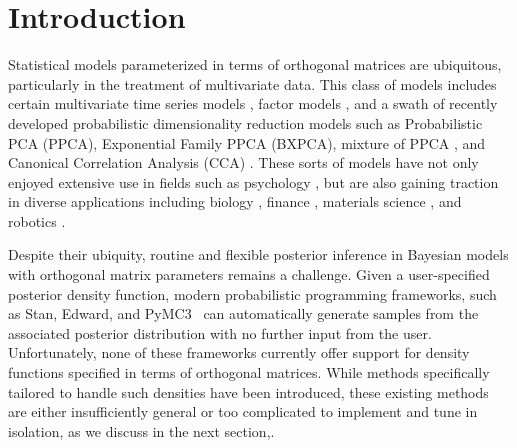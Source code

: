 \documentclass[ba]{imsart}
\numberwithin{equation}{section}
\theoremstyle{plain}
\begin{document}
\section{Introduction}
Statistical models parameterized in terms of orthogonal matrices are ubiquitous, particularly in the treatment of multivariate data. This class of models includes certain multivariate time series models \citep{brockwell2002introduction}, factor models \citep{johnson2004multivariate}, and a swath of recently developed probabilistic dimensionality reduction models such as Probabilistic PCA (PPCA),  Exponential Family PPCA (BXPCA), mixture of PPCA \citep{ghahramani1996algorithm}, and Canonical Correlation Analysis (CCA) \citep[Chapt.~12.5]{murphy2012machine}. These sorts of models have not only enjoyed extensive use in fields such as psychology \citep{ford1986application}, but are also gaining traction in diverse applications including biology \citep{hamelryck2006sampling}, finance \citep{lee2007bayesian}, materials science \citep{oh20172d}, and robotics \citep{lu1997robot}.

\noindent Despite their ubiquity, routine and flexible posterior inference in Bayesian models with orthogonal matrix parameters remains a challenge. Given a user-specified posterior density function, modern probabilistic programming frameworks, such as Stan, Edward, and PyMC3~\citep{carpenter2016stan,tran2016edward,salvatier2016probabilistic} can automatically generate samples from the associated posterior distribution with no further input from the user. Unfortunately, none of these frameworks currently offer support for density functions specified in terms of orthogonal matrices. While methods specifically tailored to handle such densities have been introduced, these existing methods are either insufficiently general or too complicated to implement and tune in isolation, as we discuss in the next section,.
\end{document}
